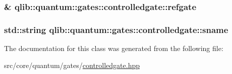 \subsubsection[{\texorpdfstring{refgate}{refgate}}]{\& qlib\+::quantum\+::gates\+::controlledgate\+::refgate\hspace{0.3cm}{\ttfamily [private]}}\hypertarget{classqlib_1_1quantum_1_1gates_1_1controlledgate_a8712f70ae76ec442aebad49109ddea97}{}\label{classqlib_1_1quantum_1_1gates_1_1controlledgate_a8712f70ae76ec442aebad49109ddea97}
\subsubsection[{\texorpdfstring{sname}{sname}}]{\setlength{\rightskip}{0pt plus 5cm}std\+::string qlib\+::quantum\+::gates\+::controlledgate\+::sname\hspace{0.3cm}{\ttfamily [private]}}\hypertarget{classqlib_1_1quantum_1_1gates_1_1controlledgate_a638c7bead4c936bc0c8672a1fee4b50f}{}\label{classqlib_1_1quantum_1_1gates_1_1controlledgate_a638c7bead4c936bc0c8672a1fee4b50f}


The documentation for this class was generated from the following file\+:\begin{DoxyCompactItemize}
\item 
src/core/quantum/gates/\hyperlink{controlledgate_8hpp}{controlledgate.\+hpp}\end{DoxyCompactItemize}
